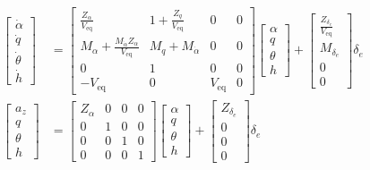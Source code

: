 \begin{equation*}
  \begin{split}
    \begin{bmatrix}
      \dot{\alpha} \\
      \dot{q} \\
      \dot{\theta} \\
      \dot{h}
    \end{bmatrix}
    &=
    \begin{bmatrix}
      \frac{Z_{\alpha}}{V_{\text{eq}}} & 1+\frac{Z_{q}}{V_{\text{eq}}} & 0 & 0\\
      M_{\alpha}+\frac{M_{\dot{\alpha}}Z_{\alpha}}{V_{\text{eq}}} & M_{q}+M_{\dot{\alpha}} & 0 & 0 \\
      0 & 1 & 0 & 0 \\
      -V_{\text{eq}} & 0 & V_{\text{eq}} & 0
    \end{bmatrix}
    \begin{bmatrix}
      \alpha \\
      q \\
      \theta \\
      h
    \end{bmatrix}+
    \begin{bmatrix}
      \frac{Z_{\delta_{e}}}{V_{\text{eq}}} \\
      M_{\delta_{e}} \\
      0 \\
      0
    \end{bmatrix}
    \delta_{e} \\
    \begin{bmatrix}
      a_{z} \\
      q \\
      \theta \\
      h
    \end{bmatrix}
    &=
    \begin{bmatrix}
      Z_{\alpha} & 0 & 0 & 0 \\
      0 & 1 & 0 & 0 \\
      0 & 0 & 1 & 0 \\
      0 & 0 & 0 & 1
    \end{bmatrix}
    \begin{bmatrix}
      \alpha \\
      q \\
      \theta \\
      h
    \end{bmatrix}+
    \begin{bmatrix}
      Z_{\delta_{e}} \\
      0 \\
      0 \\
      0
    \end{bmatrix}
    \delta_{e}
  \end{split}
\end{equation*}

